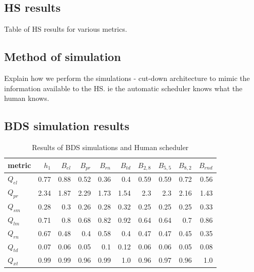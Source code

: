\subsection{HS results}
Table of HS results for various metrics.

\subsection{Method of simulation}
Explain how we perform the simulations - cut-down architecture to mimic the information available to the HS. ie the automatic scheduler knows what the human knows.

\subsection{BDS simulation results}

\begin{table}
\begin{center}
\begin{tabular}{|l|rrrrrrrrr|}
\hline
{\bf metric} & {\bf $h_1$} & {\bf $B_{el}$} &  {\bf $B_{pr}$} & {\bf $B_{rn}$} & {\bf $B_{td}$} & {\bf $B_{2,8}$} & {\bf $B_{5,5}$} & {\bf $B_{8,2}$} & {\bf $B_{rnd}$}\\
\hline
{\bf $Q_{el}$} & 0.77 & 0.88 & 0.52 & 0.36 & 0.4  & 0.59 & 0.59 & 0.72 & 0.56 \\
{\bf $Q_{pr}$} & 2.34 & 1.87 & 2.29 & 1.73 & 1.54 & 2.3  & 2.3  & 2.16 & 1.43 \\
{\bf $Q_{sm}$} & 0.28 & 0.3  & 0.26 & 0.28 & 0.32 & 0.25 & 0.25 & 0.25 & 0.33 \\
{\bf $Q_{lm}$} & 0.71 & 0.8  & 0.68 & 0.82 & 0.92 & 0.64 & 0.64 & 0.7  & 0.86 \\
{\bf $Q_{rn}$} & 0.67 & 0.48 & 0.4  & 0.58 & 0.4  & 0.47 & 0.47 & 0.45 & 0.35 \\
{\bf $Q_{td}$} & 0.07 & 0.06 & 0.05 & 0.1  & 0.12 & 0.06 & 0.06 & 0.05 & 0.08 \\
{\bf $Q_{xt}$} & 0.99 & 0.99 & 0.96 & 0.99 & 1.0  & 0.96 & 0.97 & 0.96 & 1.0  \\
\hline
\end{tabular}
\label{tab:hsbdscomp}
\caption{Results of BDS simulations and Human scheduler}
\end{center}
\end{table}


